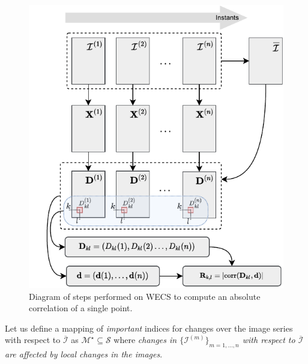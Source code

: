 \documentclass[journal]{IEEEtran}
\newcommand{\vbeta}{\pmb{\beta}}
\newcommand{\vD}{{\textbf D}}
\newcommand{\vR}{{\textbf R}}
\begin{document}


\begin{figure}[htb!]
\centering
\includegraphics[scale=.8]{../../drawio/diagram_wecs.drawio_11nov21}
\caption{Diagram of steps performed on WECS to compute an absolute correlation of a single point.}
\label{F:EllipsoidChanges}
\end{figure}


Let us define a mapping of \textit{important} indices for changes over the image series with respect to $\overline{\mathcal I}$ as $\mathcal{M}^{\star} \subseteq \mathcal{S}$ where \textit{changes in $\{\mathcal{I}^{(m)}\}_{m=1,\ldots,n}$ with respect to $\overline{\mathcal{I}}$ are affected by local changes in the images}.
%

\end{document}
